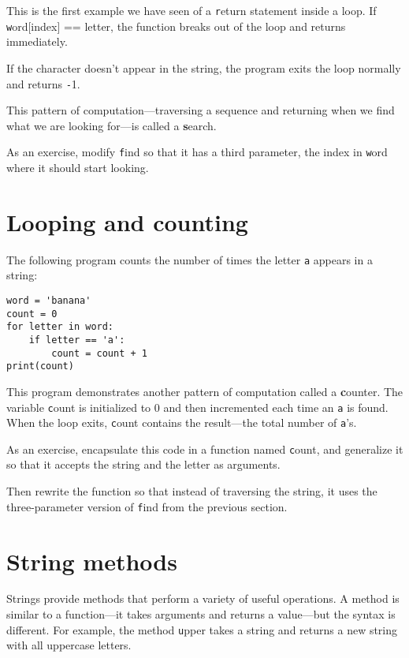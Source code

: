 \documentclass[
DIV=11,
fontsize=13,
twoside,
headinclude=false,
titlepage=firstiscover,
abstract=true,
headsepline=true,
footsepline=true,
chapterprefix=true, %
headings=big,
bibliography=totoc,%
captions=tableheading
]{scrbook}
\theoremstyle{definition}
\begin{document}
This is the first example we have seen of a {\texttt return} statement
inside a loop.  If {\texttt word[index] == letter}, the function breaks
out of the loop and returns immediately.

If the character doesn't appear in the string, the program
exits the loop normally and  returns {\texttt -1}.

This pattern of computation---traversing a sequence and returning
when we find what we are looking for---is called a {\textbf search}.

As an exercise, modify {\texttt find} so that it has a
third parameter, the index in {\texttt word} where it should start
looking.


\section{Looping and counting}
\label{counter}

The following program counts the number of times the letter {\texttt a}
appears in a string:

\begin{lstlisting}
word = 'banana'
count = 0
for letter in word:
    if letter == 'a':
        count = count + 1
print(count)
\end{lstlisting}
%
This program demonstrates another pattern of computation called a {\textbf
counter}.  The variable {\texttt count} is initialized to 0 and then
incremented each time an {\texttt a} is found.
When the loop exits, {\texttt count}
contains the result---the total number of {\texttt a}'s.

As an exercise, encapsulate this code in a function named {\texttt
count}, and generalize it so that it accepts the string and the
letter as arguments.

Then rewrite the function so that instead of
traversing the string, it uses the three-parameter version of {\texttt
find} from the previous section.


\section{String methods}
\label{optional}

Strings provide methods that perform a variety of useful operations.
A method is similar to a function---it takes arguments and
returns a value---but the syntax is different.  For example, the
method {\texttt upper} takes a string and returns a new string with
all uppercase letters.
\end{document}
